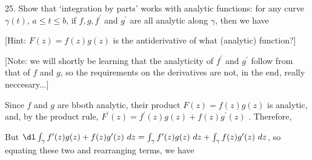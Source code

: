 



\loadmsbm

\dl{\displaystyle}
\ctln{\centerline}
\ssk{\smallskip}
\msk{\medskip}
\bsk{\bigskip}
\ubr{\underbar}

\overfullrule=0pt
\nopagenumbers



\bsk

\bsk

\item{25.} Show that `integration by parts' works with analytic functions: 
for any curve $\gamma(t)$, $a\leq t\leq b$, 
if $f,g,f^\prime$ and $g^\prime$ are all analytic along $\gamma$, then 
we have

\ssk


\ssk

\item{} [Hint: $F(z)=f(z)g(z)$ is the antiderivative of what (analytic) function?]

\item{} [Note: we will shortly be learning that the analyticity of $f^\prime$ and $g^\prime$ follow from that of $f$ 
and $g$, so the requirements on the derivatives are not, in the end, really neccesary...]

\msk

\item{} Since $f$ and $g$ are bboth analytic, their product $F(z)=f(z)g(z)$ is analytic, and, by the
product rule, $F^\prime(z)=f^{\prime}(z)g(z)+f(z)g^{\prime}(z)$ . Therefore,

\ssk


\ssk

\item{} But $\dl\int_\gamma f^{\prime}(z)g(z)+f(z)g^{\prime}(z)\ dz = 
\int_\gamma f^{\prime}(z)g(z)\ dz +  \int_\gamma f(z)g^{\prime}(z)\ dz$, so equating these two and
rearranging terms, we have 

